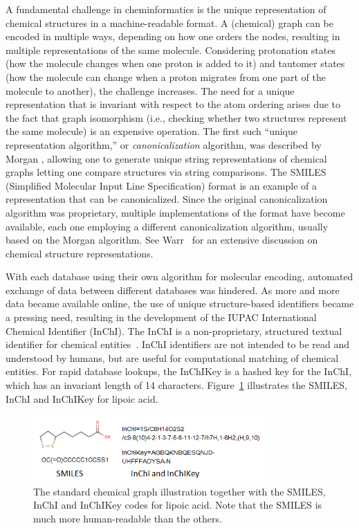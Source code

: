 \documentclass{sig-alternate}
\begin{document}
A fundamental challenge in cheminformatics is the unique
representation of chemical structures in a machine-readable format. A
(chemical) graph can be encoded in multiple ways, depending on how one
orders the nodes, resulting in multiple representations of the same
molecule. Considering protonation states 
(how the molecule changes when one proton is added
to it) and tautomer states (how the molecule can change when a proton
migrates from one part of the molecule to another), the challenge  
increases. The need for a unique representation that is invariant with
respect to the atom ordering arises due to the fact that graph
isomorphism (i.e., checking whether two structures represent the same molecule) is an
expensive operation. The first such ``unique representation
algorithm,'' or \emph{canonicalization} algorithm, was described by
Morgan \cite{Morgan1965}, allowing one to generate unique string
representations of chemical graphs letting one compare structures via
string comparisons. The SMILES (Simplified Molecular Input Line
Specification) format \cite{Weininger:1988kx} is an example of a
representation that can be canonicalized. Since the original
canonicalization algorithm was proprietary, multiple implementations
of the format have become available, each one employing a different
canonicalization algorithm, usually based on the Morgan algorithm. See
Warr~\cite{Warr:2011vn} for an extensive discussion on chemical
structure representations.

With each database using their own algorithm for molecular encoding,
automated exchange of data between different databases was hindered.
As more and more data became available online, the use of unique
structure-based identifiers became a pressing need, resulting in the
development of the IUPAC International Chemical Identifier (InChI). The
InChI is a non-proprietary, structured textual identifier for chemical
entities~\cite{inchi}. InChI identifiers are not intended to be read
and understood by humans, but are useful for computational matching of
chemical entities. For rapid database lookups, the InChIKey is a
hashed key for the InChI, which has an invariant length of 14
characters. Figure~\ref{figure:smiles} illustrates
the SMILES, InChI and InChIKey for lipoic acid.

\begin{figure}
\centering
\includegraphics[height=1in]{lipoicacid.png}
\caption{The standard chemical graph illustration together with the
  SMILES, InChI and InChIKey codes for lipoic acid. Note that the
  SMILES is much more human-readable than the others.}
\label{figure:smiles}
\end{figure}
\end{document}
